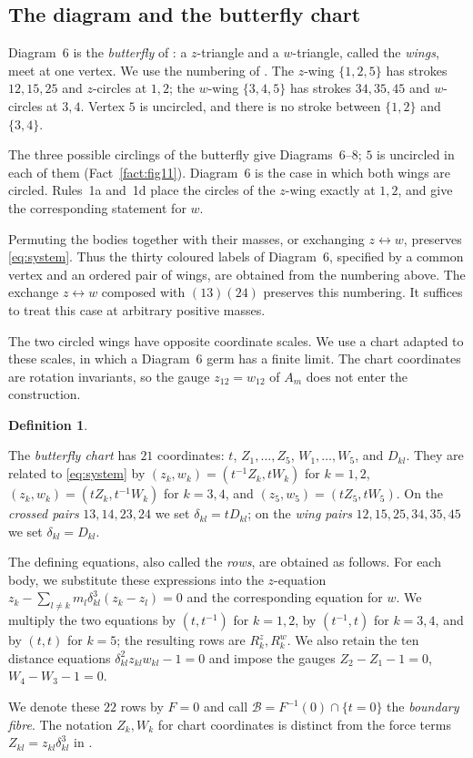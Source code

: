 \documentclass[11pt]{amsart}
\theoremstyle{definition}
\newtheorem{definition}[theorem]{Definition}
\theoremstyle{remark}
\begin{document}
\subsection{The diagram and the butterfly chart}

{
Diagram~6 is the \emph{butterfly} of \cite[\S7.4]{AK}: a $z$-triangle and a
$w$-triangle, called the \emph{wings}, meet at one vertex.  We use the numbering
of \cite[\S8.6]{AK}.  The $z$-wing $\{1,2,5\}$ has strokes $12,15,25$ and
$z$-circles at $1,2$; the $w$-wing $\{3,4,5\}$ has strokes $34,35,45$ and
$w$-circles at $3,4$.  Vertex $5$ is uncircled, and there is no stroke between
$\{1,2\}$ and $\{3,4\}$.

The three possible circlings of the butterfly give Diagrams~6--8;
$5$ is uncircled in each of them \cite[\S7.4]{AK} (Fact~\ref{fact:fig11}).
Diagram~6 is the case in which both wings are circled.  Rules~1a and~1d place
the circles of the $z$-wing exactly at $1,2$, and give the corresponding
statement for $w$.
}

{
Permuting the bodies together with their masses, or exchanging
$z\leftrightarrow w$, preserves \eqref{eq:system}.  Thus the thirty coloured
labels of Diagram~6, specified by a common vertex and an ordered pair of
wings, are obtained from the numbering above.  The exchange
$z\leftrightarrow w$ composed with $(13)(24)$ preserves this numbering.
It suffices to treat this case at arbitrary positive masses.

The two circled wings have opposite coordinate scales.  We use a chart
adapted to these scales, in which a Diagram~6 germ has a finite limit.
The chart coordinates are rotation invariants, so the gauge $z_{12}=w_{12}$
of $A_m$ does not enter the construction.
}

\begin{definition}\label{d6-def-chart}
{
The \emph{butterfly chart} has $21$ coordinates: $t$, $Z_1,\dots,Z_5$,
$W_1,\dots,W_5$, and $D_{kl}$.  They are related to \eqref{eq:system} by
$(z_k,w_k)=(t^{-1}Z_k,tW_k)$ for $k=1,2$,
$(z_k,w_k)=(tZ_k,t^{-1}W_k)$ for $k=3,4$, and
$(z_5,w_5)=(tZ_5,tW_5)$.  On the \emph{crossed pairs} $13,14,23,24$ we set
$\delta_{kl}=tD_{kl}$; on the \emph{wing pairs} $12,15,25,34,35,45$ we set
$\delta_{kl}=D_{kl}$.

The defining equations, also called the \emph{rows}, are obtained as follows.
For each body, we substitute these expressions into the $z$-equation
$z_k-\sum_{l\ne k}m_l\delta_{kl}^3(z_k-z_l)=0$ and the corresponding equation
for $w$.  We multiply the two equations by $(t,t^{-1})$ for $k=1,2$,
by $(t^{-1},t)$ for $k=3,4$, and by $(t,t)$ for $k=5$; the resulting rows are
$R^z_k,R^w_k$.  We also retain the ten distance equations
$\delta_{kl}^2z_{kl}w_{kl}-1=0$ and impose the gauges
$Z_2-Z_1-1=0$, $W_4-W_3-1=0$.

We denote these $22$ rows by $F=0$ and call
$\mathcal B=F^{-1}(0)\cap\{t=0\}$ the \emph{boundary fibre}.
The notation $Z_k,W_k$ for chart coordinates is distinct from the force
terms $Z_{kl}=z_{kl}\delta_{kl}^3$ in \cite[\S3]{AK}.
}
\end{definition}
\end{document}
